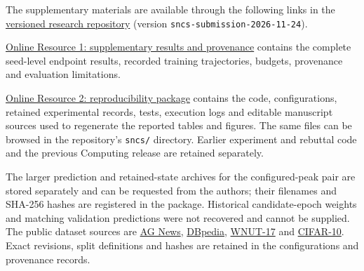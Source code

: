 \documentclass[referee,pdflatex,sn-mathphys-num]{sn-jnl}
\begin{document}
\label{data-and-code-availability}

The supplementary materials are available through the following links in the \href{https://github.com/tivdzualubem/warmup-update-budget-acml2026/tree/sncs-submission-2026-11-24}{versioned research repository} (version \texttt{sncs-submission-2026-11-24}).

\href{https://github.com/tivdzualubem/warmup-update-budget-acml2026/raw/refs/tags/sncs-submission-2026-11-24/submission/sncs-2026-11-24/ESM_1.pdf}{Online Resource 1: supplementary results and provenance} contains the complete seed-level endpoint results, recorded training trajectories, budgets, provenance and evaluation limitations.

\href{https://github.com/tivdzualubem/warmup-update-budget-acml2026/raw/refs/tags/sncs-submission-2026-11-24/submission/sncs-2026-11-24/ESM_2.zip}{Online Resource 2: reproducibility package} contains the code, configurations, retained experimental records, tests, execution logs and editable manuscript sources used to regenerate the reported tables and figures. The same files can be browsed in the repository's \texttt{sncs/} directory. Earlier experiment and rebuttal code and the previous Computing release are retained separately.

The larger prediction and retained-state archives for the configured-peak pair are stored separately and can be requested from the authors; their filenames and SHA-256 hashes are registered in the package. Historical candidate-epoch weights and matching validation predictions were not recovered and cannot be supplied. The public dataset sources are \href{https://huggingface.co/datasets/fancyzhx/ag_news}{AG News}, \href{https://huggingface.co/datasets/fancyzhx/dbpedia_14}{DBpedia}, \href{https://huggingface.co/datasets/flaitenberger/wnut_17}{WNUT-17} and \href{https://huggingface.co/datasets/uoft-cs/cifar10}{CIFAR-10}. Exact revisions, split definitions and hashes are retained in the configurations and provenance records.

\end{document}
